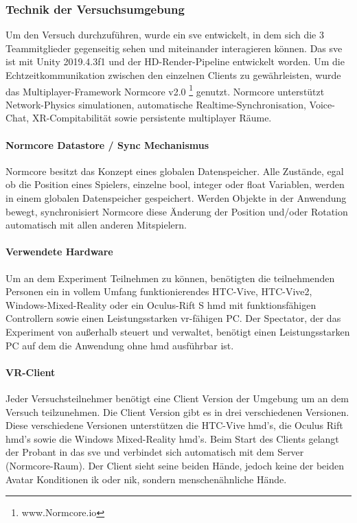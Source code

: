 \documentclass[a4paper,11pt]{article}%
\renewcommand{\\}{\vspace*{0.5\baselineskip} \newline}
\begin{document}
\subsubsection{Technik der Versuchsumgebung}
Um den Versuch durchzuführen, wurde ein \ac{sve} entwickelt, in dem sich die 3 Teammitglieder gegenseitig sehen und miteinander interagieren können. 
Das \ac{sve} ist mit Unity 2019.4.3f1 und der HD-Render-Pipeline entwickelt worden. Um die Echtzeitkommunikation zwischen den einzelnen Clients zu gewährleisten, wurde das Multiplayer-Framework \dq{}Normcore v2.0\dq{} \footnote{www.Normcore.io} genutzt.
Normcore unterstützt Network-Physics simulationen, automatische Realtime-Synchronisation, Voice-Chat, XR-Compitabilität sowie persistente multiplayer Räume.	

\paragraph{Normcore Datastore / Sync Mechanismus}
Normcore besitzt das Konzept eines globalen Datenspeicher.  Alle Zustände, egal ob die Position eines Spielers, einzelne bool, integer oder float Variablen, werden in einem globalen Datenspeicher gespeichert. Werden Objekte in der Anwendung bewegt, synchronisiert Normcore diese Änderung der Position und/oder Rotation automatisch mit allen anderen Mitspielern.

\paragraph{Verwendete Hardware}
Um an dem Experiment Teilnehmen zu können, benötigten die teilnehmenden Personen ein in vollem Umfang funktionierendes HTC-Vive, HTC-Vive2, Windows-Mixed-Reality oder ein Oculus-Rift S \ac{hmd} mit funktionsfähigen Controllern sowie einen Leistungsstarken \ac{vr}-fähigen PC. Der Spectator, der das Experiment von außerhalb steuert und verwaltet, benötigt einen Leistungsstarken PC auf dem die Anwendung ohne \ac{hmd} ausführbar ist.

\paragraph{VR-Client}
Jeder Versuchsteilnehmer benötigt eine Client Version der Umgebung um an dem Versuch teilzunehmen. Die Client Version gibt es in drei verschiedenen Versionen. Diese verschiedene Versionen unterstützen die HTC-Vive \ac{hmd}'s, die Oculus Rift \ac{hmd}'s sowie die Windows Mixed-Reality \ac{hmd}'s. Beim Start des Clients gelangt der Probant in das \ac{sve} und verbindet sich automatisch mit dem Server (Normcore-Raum).
Der Client sieht seine beiden Hände, jedoch keine der beiden Avatar Konditionen \ac{ik} oder \ac{nik}, sondern menschenähnliche Hände.
\end{document}
